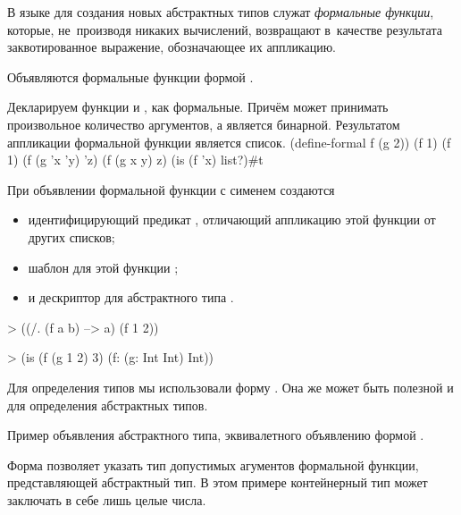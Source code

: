 В языке \Scheme для создания новых абстрактных типов служат \emph{формальные функции}, которые, не~производя никаких вычислений, возвращают в~качестве результата заквотированное выражение, обозначающее их аппликацию.

Объявляются формальные функции формой .

\begin{example}{%
Декларируем функции  и , как формальные. Причём  может принимать произвольное количество аргументов, а  является бинарной. Результатом аппликации формальной функции является список.}
\REPLin
  {(define-formal f (g 2))}
\REPL
  {(f 1)}
  {(f 1)}
\REPL
  {(f (g 'x 'y) 'z)}
  {(f (g x y) z)}
\REPL
  {(is (f 'x) list?)}{#t}
\end{example}

\begin{example}{%
При объявлении формальной функции с сименем  создаются
\begin{itemize}
\item идентифицирующий предикат , отличающий аппликацию этой функции от других списков; 
\item шаблон для этой функции ; 
\item и дескриптор для абстрактного типа .
\end{itemize}}
\smallskip
\begin{ExampleCode}
> ((/. (f a b) --> a) 
   (f 1 2))
\end{ExampleCode}
\smallskip
\begin{ExampleCode}
> (is (f (g 1 2) 3)
      (f: (g: Int Int) Int))
\end{ExampleCode}
\end{example}

Для определения типов мы использовали форму . Она же может быть полезной и для определения абстрактных типов.

\begin{example}{%
Пример объявления абстрактного типа, эквивалетного объявлению формой .}
\end{example}
\begin{example}{%
Форма  позволяет указать тип допустимых агументов формальной функции, представляющей абстрактный тип. В этом примере контейнерный тип  может заключать в себе лишь целые числа.}
\end{example}



